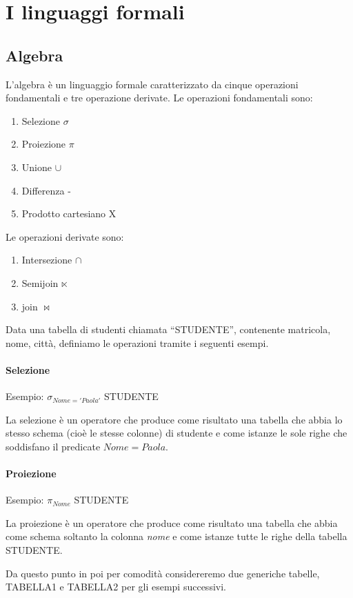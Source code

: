\documentclass[\main/main.tex]{subfiles}
\begin{document}
\chapter{I linguaggi formali}
\section{Algebra}
L'algebra è un linguaggio formale caratterizzato da cinque operazioni fondamentali e tre operazione derivate.
Le operazioni fondamentali sono:
\begin{enumerate}
  \item Selezione $\sigma$
  \item Proiezione $\pi$
  \item Unione $\cup$
  \item Differenza -
  \item Prodotto cartesiano X
\end{enumerate}
Le operazioni derivate sono:
\begin{enumerate}
  \item Intersezione $\cap$
  \item Semijoin $\ltimes$
  \item join $\bowtie$
\end{enumerate}

Data una tabella di studenti chiamata ``STUDENTE'', contenente matricola, nome, città, definiamo le operazioni tramite i seguenti esempi.


\subsubsection{Selezione}

Esempio: $\sigma_{Nome='Paola'}$ STUDENTE

La selezione è un operatore che produce come risultato una tabella che abbia lo stesso schema (cioè le stesse colonne) di studente e come istanze le sole righe che soddisfano il predicate $Nome=Paola$.

\subsubsection{Proiezione}

Esempio: $\pi_{Nome}$ STUDENTE

La proiezione è un operatore che produce come risultato una tabella che abbia come schema soltanto la colonna \textit{nome} e come istanze tutte le righe della tabella STUDENTE.

Da questo punto in poi per comodità considereremo due generiche tabelle, TABELLA1 e TABELLA2 per gli esempi successivi.
\end{document}
